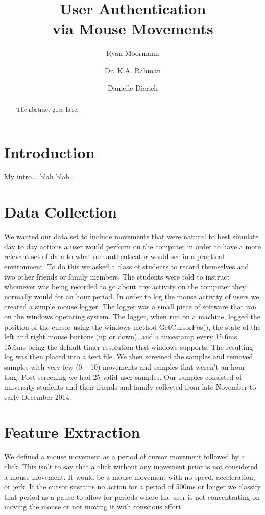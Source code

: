 \documentclass[conference]{IEEEtran}
\title{User Authentication\\via Mouse Movements}
\author{Ryan Moormann \\ \IEEEauthorblockN{some author afiliation}
\and
Dr. K.A. Rahman\\ \IEEEauthorblockN{another affiliation}
\and
Danielle Dierich\\ \IEEEauthorblockN{another affiliation}
}
\begin{document}
\maketitle


\begin{abstract}
The abstract goes here.
\end{abstract}
\IEEEpeerreviewmaketitle

\section{Introduction}
My intro... blah blah \cite{jj2}.

\section{Data Collection}
We wanted our data set to include movements that were natural to best simulate day to day actions a user would perform on the computer in order to have a more relevant set of data to what our authenticator would see in a practical environment. To do this we asked a class of students to record themselves and two other friends or family members. The students were told to instruct whomever was being recorded to go about any activity on the computer they normally would for an hour period.  
	In order to log the mouse activity of users we created a simple mouse logger.  The logger was a small piece of software that ran on the windows operating system. The logger, when run on a machine, logged the position of the cursor using the windows method GetCursorPos(), the state of the left and right mouse buttons (up or down), and a timestamp every 15.6ms. 15.6ms being the default timer resolution that windows supports. The resulting log was then placed into a text file. 
We then screened the samples and removed samples with very few (0 – 10) movements and samples that weren't an hour long. Post-screening we had 25 valid user samples.  Our samples consisted of university students and their friends and family collected from late November to early December 2014.

\section{Feature Extraction}
	We defined a mouse movement as a period of cursor movement followed by a click. This isn't to say that a click without any movement prior is not considered a mouse movement. It would be a mouse movement with no speed, acceleration, or jerk. If the cursor sustains no action for a period of 500ms or longer we classify that period as a pause to allow for periods where the user is not concentrating on moving the mouse or not moving it with conscious effort.
\end{document}
